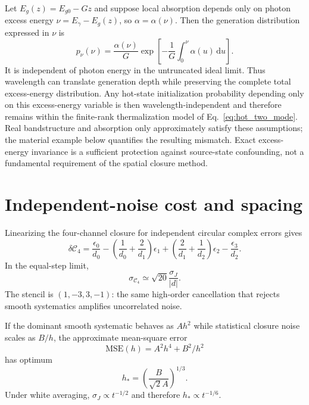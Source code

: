 \documentclass[11pt]{article}
\newcommand{\Cfour}{\mathcal{C}_4}
\newcommand{\dd}{\mathrm{d}}
\begin{document}
Let $E_g(z)=E_{g0}-Gz$ and suppose local absorption depends only on photon excess energy $\nu=E_\gamma-E_g(z)$, so $\alpha=\alpha(\nu)$. Then the generation distribution expressed in $\nu$ is
\begin{equation}
\boxed{
p_\nu(\nu)
=\frac{\alpha(\nu)}{G}
\exp\left[-\frac{1}{G}\int_0^\nu\alpha(u)\,\dd u\right].}
\label{eq:energyinvariance}
\end{equation}
It is independent of photon energy in the untruncated ideal limit. Thus wavelength can translate generation depth while preserving the complete total excess-energy distribution. Any hot-state initialization probability depending only on this excess-energy variable is then wavelength-independent and therefore remains within the finite-rank thermalization model of Eq.~\eqref{eq:hot_two_mode}. Real bandstructure and absorption only approximately satisfy these assumptions; the material example below quantifies the resulting mismatch. Exact excess-energy invariance is a sufficient protection against source-state confounding, not a fundamental requirement of the spatial closure method.

\section{Independent-noise cost and spacing}

Linearizing the four-channel closure for independent circular complex errors gives
\begin{equation}
\delta\Cfour
=\frac{\epsilon_0}{d_0}
-\left(\frac1{d_0}+\frac2{d_1}\right)\epsilon_1
+\left(\frac2{d_1}+\frac1{d_2}\right)\epsilon_2
-\frac{\epsilon_3}{d_2}.
\end{equation}
In the equal-step limit,
\begin{equation}
\boxed{
\sigma_{\Cfour}\simeq\sqrt{20}\frac{\sigma_J}{|d|}.}
\label{eq:fournoise}
\end{equation}
The stencil is $(1,-3,3,-1)$: the same high-order cancellation that rejects smooth systematics amplifies uncorrelated noise.

If the dominant smooth systematic behaves as $Ah^2$ while statistical closure noise scales as $B/h$, the approximate mean-square error
\begin{equation}
\mathrm{MSE}(h)=A^2h^4+B^2/h^2
\end{equation}
has optimum
\begin{equation}
\boxed{h_*=\left(\frac{B}{\sqrt2A}\right)^{1/3}.}
\label{eq:hopt}
\end{equation}
Under white averaging, $\sigma_J\propto t^{-1/2}$ and therefore $h_*\propto t^{-1/6}$.
\end{document}
